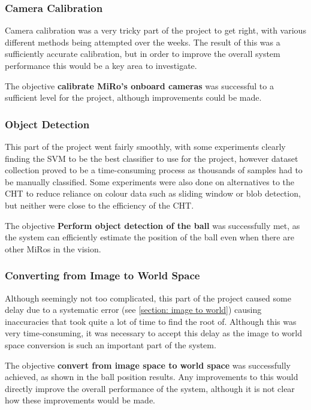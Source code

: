 \subsubsection{Camera Calibration}

Camera calibration was a very tricky part of the project to get right, with various different methods being attempted over the weeks. The result of this was a sufficiently accurate calibration, but in order to improve the overall system performance this would be a key area to investigate. 

The objective \textbf{calibrate MiRo's onboard cameras} was successful to a sufficient level for the project, although improvements could be made. 

\subsubsection{Object Detection}

This part of the project went fairly smoothly, with some experiments clearly finding the SVM to be the best classifier to use for the project, however dataset collection proved to be a time-consuming process as thousands of samples had to be manually classified. Some experiments were also done on alternatives to the CHT to reduce reliance on colour data such as sliding window or blob detection, but neither were close to the efficiency of the CHT.

The objective \textbf{Perform object detection of the ball} was successfully met, as the system can efficiently estimate the position of the ball even when there are other MiRos in the vision.

\subsubsection{Converting from Image to World Space}

Although seemingly not too complicated, this part of the project caused some delay due to a systematic error (see \ref{section: image to world}) causing inaccuracies that took quite a lot of time to find the root of. Although this was very time-consuming, it was necessary to accept this delay as the image to world space conversion is such an important part of the system. 

The objective \textbf{convert from image space to world space} was successfully achieved, as shown in the ball position results. Any improvements to this would directly improve the overall performance of the system, although it is not clear how these improvements would be made.

